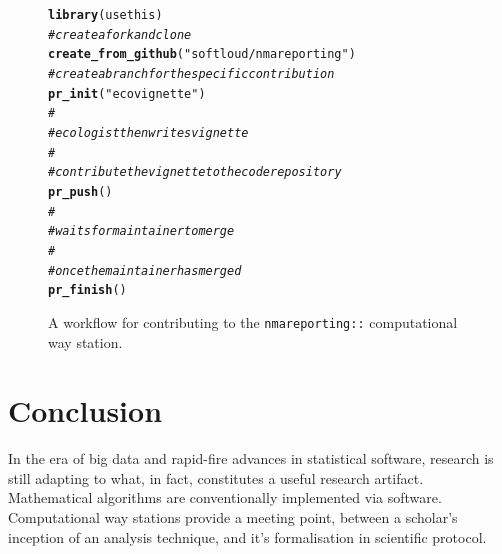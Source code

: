\documentclass[12pt]{article}\usepackage[]{graphicx}\usepackage[]{color}
\makeatletter
\newcommand{\hlstr}[1]{\textcolor[rgb]{0.192,0.494,0.8}{#1}}%
\newcommand{\hlcom}[1]{\textcolor[rgb]{0.678,0.584,0.686}{\textit{#1}}}%
\newcommand{\hlstd}[1]{\textcolor[rgb]{0.345,0.345,0.345}{#1}}%
\newcommand{\hlkwd}[1]{\textcolor[rgb]{0.737,0.353,0.396}{\textbf{#1}}}%
\newenvironment{kframe}{%
 \def\at@end@of@kframe{}%
 \ifinner\ifhmode%
  \def\at@end@of@kframe{\end{minipage}}%
  \begin{minipage}{\columnwidth}%
 \fi\fi%
 \def\FrameCommand##1{\hskip\@totalleftmargin \hskip-\fboxsep
 \colorbox{shadecolor}{##1}\hskip-\fboxsep
     \hskip-\linewidth \hskip-\@totalleftmargin \hskip\columnwidth}%
 \MakeFramed {\advance\hsize-\width
   \@totalleftmargin\z@ \linewidth\hsize
   \@setminipage}}%
 {\par\unskip\endMakeFramed%
 \at@end@of@kframe}
\newenvironment{knitrout}{}{} %
\newcommand{\package}[1]{\texttt{{#1::}}}
\makeatother
\begin{document}
\begin{figure}

\begin{knitrout}
\color{fgcolor}\begin{kframe}
\begin{alltt}
\hlkwd{library}\hlstd{(usethis)}
\hlcom{# create a fork and clone}
\hlkwd{create_from_github}\hlstd{(}\hlstr{"softloud/nmareporting"}\hlstd{)}
\hlcom{# create a branch for the specific contribution}
\hlkwd{pr_init}\hlstd{(}\hlstr{"ecovignette"}\hlstd{)}
\hlcom{#}
\hlcom{# ecologist then writes vignette}
\hlcom{#}
\hlcom{# contribute the vignette to the code repository}
\hlkwd{pr_push}\hlstd{()}
\hlcom{#}
\hlcom{# waits for maintainer to merge}
\hlcom{#}
\hlcom{# once the maintainer has merged}
\hlkwd{pr_finish}\hlstd{()}
\end{alltt}
\end{kframe}
\end{knitrout}

\caption{A workflow for contributing to the \package{nmareporting} computational way station.}
\label{fig:workflow}
\end{figure}

\section{Conclusion}

In the era of big data and rapid-fire advances in statistical software, research is still adapting to what, in fact, constitutes a useful research artifact. Mathematical algorithms are conventionally implemented via software. Computational way stations provide a meeting point, between a scholar's inception of an analysis technique, and it's formalisation in scientific protocol.




\end{document}

